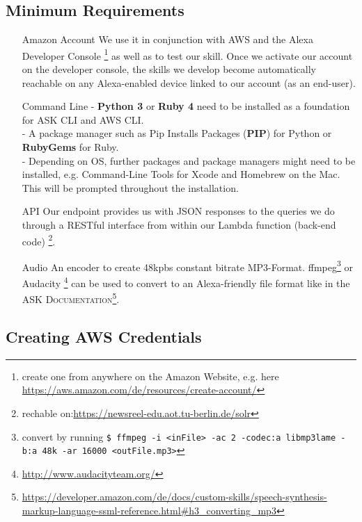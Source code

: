 \subsection*{Minimum Requirements}
\begin{itemize}
	\item[Amazon Account] We use it in conjunction with AWS and the Alexa Developer Console \footnote{create one from anywhere on the Amazon Website, e.g. here \url{https://aws.amazon.com/de/resources/create-account/}} as well as to test our skill. Once we activate our account on the developer console, the skills we develop become automatically reachable on any Alexa-enabled device linked to our account (as an end-user).
	
	\item[Command Line] - \textbf{Python 3} or\textbf{ Ruby 4} need to be installed as a foundation for ASK CLI and AWS CLI.\\
	- A package manager such as Pip Installs Packages (\textbf{PIP}) for Python or \textbf{RubyGems} for Ruby.\\
	- Depending on OS, further packages and package managers might need to be installed, e.g. Command-Line Tools for Xcode and Homebrew on the Mac. This will be prompted throughout the installation.
	
	
	\item[API] Our endpoint provides us with JSON responses to the queries we do through a RESTful interface from within our Lambda function (back-end code) \footnote{rechable on:\url{https://newsreel-edu.aot.tu-berlin.de/solr}}.
	
	\item[Audio] An encoder to create 48kpbs constant bitrate MP3-Format. ffmpeg\footnote{convert by running \lstinline|$ ffmpeg -i <inFile> -ac 2 -codec:a libmp3lame -b:a 48k -ar 16000 <outFile.mp3>|} or Audacity \footnote{\url{http://www.audacityteam.org/}} can be used to convert to an Alexa-friendly file format like in the \textsc{ASK Documentation}\footnote{\url{https://developer.amazon.com/de/docs/custom-skills/speech-synthesis-markup-language-ssml-reference.html\#h3_converting_mp3}}.
	
\end{itemize}


\subsection*{Creating AWS Credentials}

